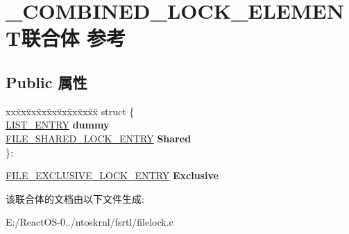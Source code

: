 \hypertarget{union___c_o_m_b_i_n_e_d___l_o_c_k___e_l_e_m_e_n_t}{}\section{\+\_\+\+C\+O\+M\+B\+I\+N\+E\+D\+\_\+\+L\+O\+C\+K\+\_\+\+E\+L\+E\+M\+E\+N\+T联合体 参考}
\label{union___c_o_m_b_i_n_e_d___l_o_c_k___e_l_e_m_e_n_t}
\subsection*{Public 属性}
\begin{DoxyCompactItemize}
\item 
\mbox{\label{union___c_o_m_b_i_n_e_d___l_o_c_k___e_l_e_m_e_n_t_acbd15598718e1ce1cb4ccbba2bda9b35}} 
\begin{tabbing}
xx\=xx\=xx\=xx\=xx\=xx\=xx\=xx\=xx\=\kill
struct \{\\
\>\hyperlink{struct___l_i_s_t___e_n_t_r_y}{LIST\_ENTRY} {\bfseries dummy}\\
\>\hyperlink{struct___f_i_l_e___s_h_a_r_e_d___l_o_c_k___e_n_t_r_y}{FILE\_SHARED\_LOCK\_ENTRY} {\bfseries Shared}\\
\}; \\

\end{tabbing}\item 
\mbox{\label{union___c_o_m_b_i_n_e_d___l_o_c_k___e_l_e_m_e_n_t_a5f5216bdc3ad6bb3f16583555e3d4033}} 
\hyperlink{struct___f_i_l_e___e_x_c_l_u_s_i_v_e___l_o_c_k___e_n_t_r_y}{F\+I\+L\+E\+\_\+\+E\+X\+C\+L\+U\+S\+I\+V\+E\+\_\+\+L\+O\+C\+K\+\_\+\+E\+N\+T\+RY} {\bfseries Exclusive}
\end{DoxyCompactItemize}


该联合体的文档由以下文件生成\+:\begin{DoxyCompactItemize}
\item 
E\+:/\+React\+O\+S-\/0../ntoskrnl/fsrtl/filelock.\+c\end{DoxyCompactItemize}
